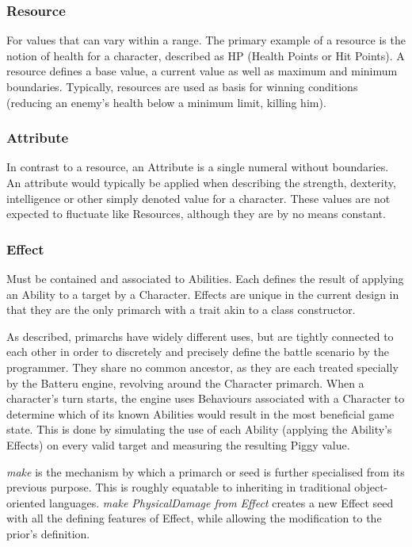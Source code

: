 \subsubsection{Resource}
For values that can vary within a range. The primary example of a resource is the notion of health for a character, described as HP (Health Points or Hit Points). A resource defines a base value, a current value as well as maximum and minimum boundaries. Typically, resources are used as basis for winning conditions (reducing an enemy's health below a minimum limit, killing him).

\subsubsection{Attribute} 
In contrast to a resource, an Attribute is a single numeral without boundaries. An attribute would typically be applied when describing the strength, dexterity, intelligence or other simply denoted value for a character. These values are not expected to fluctuate like Resources, although they are by no means constant.

\subsubsection{Effect}
Must be contained and associated to Abilities. Each defines the result of applying an Ability to a target by a Character. Effects are unique in the current design  in that they are the only primarch with a trait akin to a class constructor.

\noindent As described, primarchs have widely different uses, but are tightly connected to each other in order to discretely and precisely define the battle scenario by the programmer. They share no common ancestor, as they are each treated specially by the Batteru engine, revolving around the Character primarch. When a character's turn starts, the engine uses Behaviours associated with a Character to determine which of its known Abilities would result in the most beneficial game state. This is done by simulating the use of each Ability (applying the Ability's Effects) on every valid target and measuring the resulting Piggy value.

\emph{make} is the mechanism by which a primarch or seed is further specialised from its previous purpose. This is roughly equatable to inheriting in traditional object-oriented languages. \emph{make PhysicalDamage from Effect} creates a new Effect seed with all the defining features of Effect, while allowing the modification to the prior's definition.

